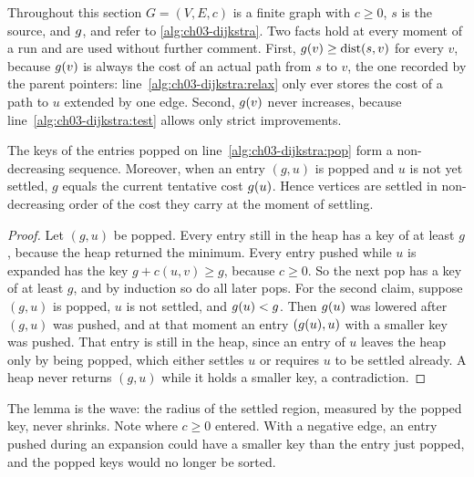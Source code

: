 Throughout this section $G=(V,E,c)$ is a finite graph with $c\ge0$, $s$ is the source, and
$g$, \Open and \Closed refer to \cref{alg:ch03-dijkstra}. Two facts hold at every moment
of a run and are used without further comment. First, $g(v)\ge\operatorname{dist}(s,v)$ for every $v$,
because $g(v)$ is always the cost of an actual path from $s$ to $v$, the one recorded by
the parent pointers: line~\ref{alg:ch03-dijkstra:relax} only ever stores the cost of a path to
$u$ extended by one edge. Second, $g(v)$ never increases, because
line~\ref{alg:ch03-dijkstra:test} allows only strict improvements.

\begin{lemma}
\label{lem:ch03-monotone}
%
The keys of the entries popped on line~\ref{alg:ch03-dijkstra:pop} form a non-decreasing
sequence. Moreover, when an entry $(g,u)$ is popped and $u$ is not yet settled, $g$ equals the
current tentative cost $g(u)$. Hence vertices are settled in non-decreasing order of the
cost they carry at the moment of settling.
\end{lemma}
\begin{proof}
Let $(g,u)$ be popped. Every entry still in the heap has a key of at least $g$, because the
heap returned the minimum. Every entry pushed while $u$ is expanded has the key
$g+c(u,v)\ge g$, because $c\ge0$. So the next pop has a key of at least $g$, and by induction so
do all later pops. For the second claim, suppose $(g,u)$ is popped, $u$ is not settled, and
$g(u)<g$. Then $g(u)$ was lowered after $(g,u)$ was pushed, and at that moment an
entry $(g(u),u)$ with a smaller key was pushed. That entry is still in the heap, since an
entry of $u$ leaves the heap only by being popped, which either settles $u$ or requires $u$ to
be settled already. A heap never returns $(g,u)$ while it holds a smaller key, a contradiction.
\end{proof}

The lemma is the wave: the radius of the settled region, measured by the popped key, never
shrinks. Note where $c\ge0$ entered. With a negative edge, an entry pushed during an expansion
could have a smaller key than the entry just popped, and the popped keys would no longer be
sorted.

